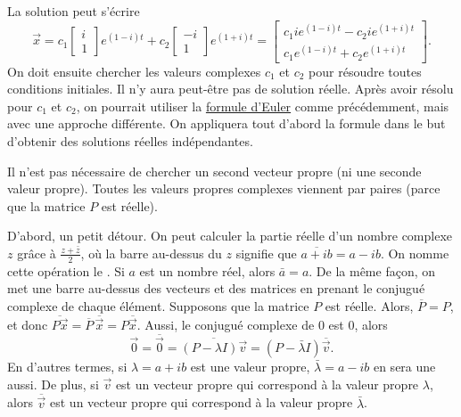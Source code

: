 La solution peut s'écrire
\begin{equation*}
\vec{x} =
c_1 \begin{bmatrix} i \\ 1 \end{bmatrix} e^{(1-i)t} +
c_2 \begin{bmatrix} -i \\ 1 \end{bmatrix} e^{(1+i)t}
=
\begin{bmatrix}
c_1 i e^{(1-i)t} - c_2 i e^{(1+i)t} \\
c_1 e^{(1-i)t} + c_2 e^{(1+i)t}
\end{bmatrix} .
\end{equation*}
On doit ensuite chercher les valeurs complexes $c_1$ et $c_2$ pour résoudre toutes conditions initiales. Il n'y aura peut-être pas de solution réelle. Après avoir résolu pour $c_1$ et $c_2$,
on pourrait utiliser la 
\hyperref[eulersformula]{formule d'Euler} comme précédemment, mais avec une approche différente. On appliquera tout d'abord la formule dans le but d'obtenir des solutions réelles indépendantes.

\medskip

Il n'est pas nécessaire de chercher un second vecteur propre (ni une seconde valeur propre). Toutes les valeurs propres complexes viennent par paires (parce que la matrice $P$ est réelle).

D'abord, un petit détour. On peut calculer la partie réelle d'un nombre complexe $z$ grâce à $\frac{z + \bar{z}}{2}$, où la barre au-dessus du $z$ signifie que $\overline{a+ib} = a -ib$. On nomme cette opération le \emph{}. Si
$a$ est un nombre réel, alors $\bar{a} = a$.
De la même façon, on met une barre au-dessus des vecteurs et des matrices en prenant le conjugué complexe de chaque élément. Supposons que la matrice $P$ est réelle. Alors, 
$\overline{P} = P$, et donc $\overline{P\vec{x}} = \overline{P} \,
\overline{\vec{x}} = P \overline{\vec{x}}$.
Aussi, le conjugué complexe de 0 est 0, alors
\begin{equation*}
\vec{0} = \overline{\vec{0}} = 
\overline{(P-\lambda I)\vec{v}}
=
(P-\bar{\lambda} I)\overline{\vec{v}} .
\end{equation*}
En d'autres termes, si $\lambda = a+ib$ est une valeur propre, $\bar{\lambda} = a-ib$ en sera une aussi. De plus, si
$\vec{v}$ est un vecteur propre qui correspond à la valeur propre
$\lambda$, alors $\overline{\vec{v}}$ est un vecteur propre qui correspond à la valeur propre $\bar{\lambda}$. 

